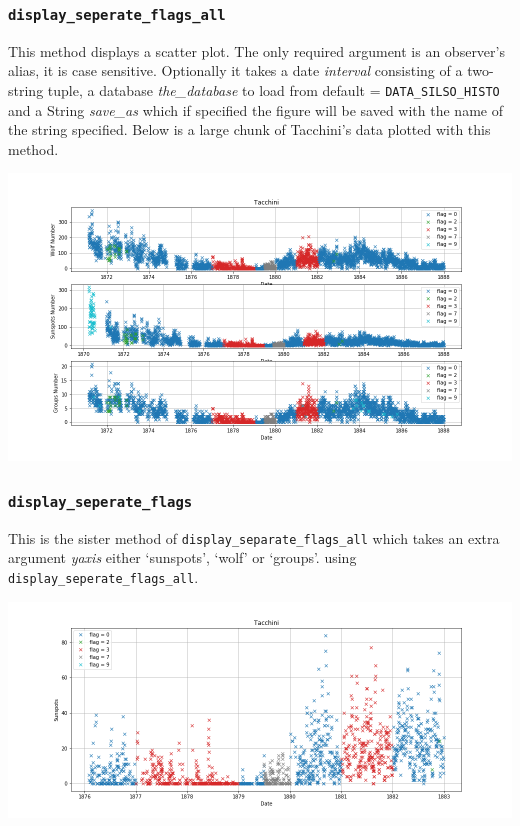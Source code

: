 \documentclass[12pt]{article}
\begin{document}
\subsubsection{\texttt{display\_seperate\_flags\_all}}
This method displays a scatter plot. The only required argument is an observer's alias, it is case sensitive. Optionally it takes a date \textit{interval} consisting of a two-string tuple, a database \textit{the\_database} to load from default = \texttt{DATA\_SILSO\_HISTO} and a String \textit{save\_as} which if specified the figure will be saved with the name of the string specified. Below is a large chunk of Tacchini's data plotted with this method.
{\centering
\includegraphics[width=\linewidth]{tacchini_pached.png}
\par}

\subsubsection{\texttt{display\_seperate\_flags}}
This is the sister method of \texttt{display\_separate\_flags\_all} which takes an extra argument \textit{yaxis} either `sunspots', `wolf' or `groups'.  using \texttt{display\_seperate\_flags\_all}.
{\centering
\includegraphics[width=\linewidth]{Tacchini patches.png}
\par}
\end{document}
